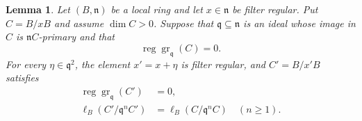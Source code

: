 \documentclass[11pt,reqno]{amsart}
\numberwithin{equation}{section}
\newtheorem{lemma}[theorem]{Lemma}
\theoremstyle{definition}
\begin{document}
\begin{lemma}\label{lem:tr-one-element}
Let $(B,\mathfrak n)$ be a local ring and let $x\in\mathfrak n$ be filter
regular. Put $C=B/xB$ and assume $\dim C>0$. Suppose that
$\mathfrak q\subseteq\mathfrak n$ is an ideal whose image in $C$
is $\mathfrak nC$-primary and that
\[
 \operatorname{reg}\operatorname{gr}_{\mathfrak q}(C)=0.
\]
For every $\eta\in\mathfrak q^2$, the element $x'=x+\eta$ is filter
regular, and $C'=B/x'B$ satisfies
\begin{align}
 \operatorname{reg}\operatorname{gr}_{\mathfrak q}(C')&=0,
 \label{eq:tr-principal-reg}\\
 \ell_B(C'/\mathfrak q^nC')&=\ell_B(C/\mathfrak q^nC)
 \quad(n\geq1).
 \label{eq:tr-principal-hf}
\end{align}
\end{lemma}
\end{document}

